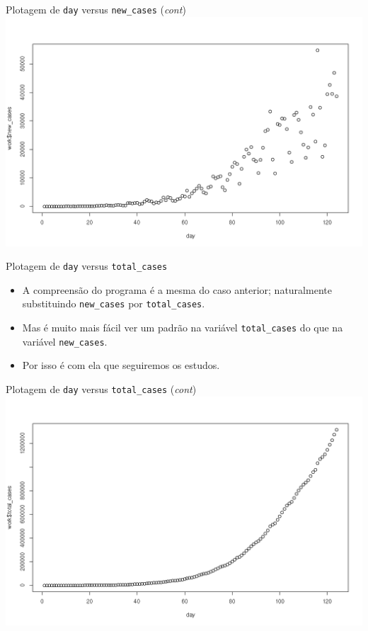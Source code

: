 \documentclass[a4paper,10pt]{beamer}
\begin{document}
\begin{frame}{ Plotagem de {\tt day} versus {\tt new\_cases} ({\em cont}) }
   \includegraphics[scale=0.375]{plot-dayXnew_cases.png}

\end{frame}

\begin{frame}{ Plotagem de {\tt day} versus  {\tt total\_cases}}
  
  
  \begin{itemize}
      \item A compreensão do programa é a mesma do caso anterior; naturalmente
	  substituindo {\tt new\_cases} por {\tt total\_cases}.
	  
      \item Mas é muito mais fácil ver um padrão na variável {\tt total\_cases}
	  do que na variável {\tt new\_cases}.
	  
      \item Por isso é com ela que seguiremos os estudos.
  \end{itemize}

\end{frame}

\begin{frame}{ Plotagem de {\tt day} versus {\tt total\_cases} ({\em cont}) }
  \includegraphics[scale=0.375]{plot-dayXtotal_cases.png}

\end{frame}
\end{document}
